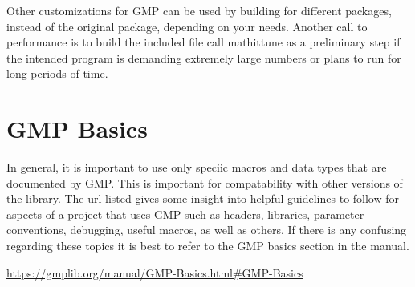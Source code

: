 Other customizations for GMP can be used by building for different packages, instead of the original package, depending on your needs.
Another call to performance is to build the included file call mathit{tune} as a preliminary step if the intended program is demanding extremely large numbers or plans to run for long periods of time.


\section{GMP Basics}

In general, it is important to use only speciic macros and data types that are documented by GMP. This is important for
compatability with other versions of the library. The url listed gives some insight into helpful guidelines to follow
for aspects of a project that uses GMP such as headers, libraries, parameter conventions, debugging, useful macros, as well as others.
If there is any confusing regarding these topics it is best to refer to the GMP basics section in the manual.

\url{https://gmplib.org/manual/GMP-Basics.html#GMP-Basics}
